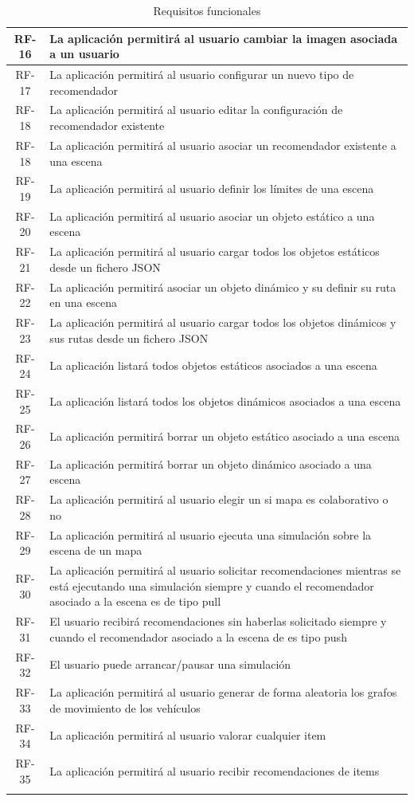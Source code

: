 \begin{longtable}[H]{|c|p{10cm}|}
	RF-16 & La aplicación permitirá al usuario cambiar la imagen asociada a un usuario\\ \hline
	RF-17 & La aplicación permitirá al usuario configurar un nuevo tipo de recomendador\\ \hline
	RF-18 & La aplicación permitirá al usuario editar la configuración de recomendador existente\\ \hline
	RF-18 & La aplicación permitirá al usuario asociar un recomendador existente a una escena\\ \hline
	RF-19 & La aplicación permitirá al usuario definir los límites de una escena\\ \hline
	RF-20 & La aplicación permitirá al usuario asociar un objeto estático a una escena\\ \hline
	RF-21 & La aplicación permitirá al usuario cargar todos los objetos estáticos desde un fichero JSON\\ \hline
	RF-22 & La aplicación permitirá asociar un objeto dinámico y su definir su ruta en una escena\\ \hline
	RF-23 & La aplicación permitirá al usuario cargar todos los objetos dinámicos y sus rutas desde un fichero JSON\\ \hline
	RF-24 & La aplicación listará todos objetos estáticos asociados a una escena \\ \hline
	RF-25 & La aplicación listará todos los objetos dinámicos asociados a una escena \\ \hline
	RF-26 & La aplicación permitirá borrar un objeto estático asociado a una escena\\ \hline
	RF-27 & La aplicación permitirá borrar un objeto dinámico asociado a una escena\\ \hline
	RF-28 & La aplicación permitirá al usuario elegir un si mapa es colaborativo o no\\ \hline
	RF-29 & La aplicación permitirá al usuario ejecuta una simulación sobre la escena de un mapa\\ \hline
	RF-30 & La aplicación permitirá al usuario solicitar recomendaciones mientras se está ejecutando una simulación siempre y cuando el recomendador asociado a la escena es de tipo pull\\ \hline
	RF-31 & El usuario recibirá recomendaciones sin haberlas solicitado siempre y cuando el recomendador asociado a la escena de es tipo push\\ \hline
	RF-32 & El usuario puede arrancar/pausar una simulación\\ \hline
	RF-33 & La aplicación permitirá al usuario generar de forma aleatoria los grafos de movimiento de los vehículos \\ \hline	
	RF-34 & La aplicación permitirá al usuario valorar cualquier item \\ \hline	
	RF-35 & La aplicación permitirá al usuario recibir recomendaciones de items \\ \hline
	\caption{Requisitos funcionales}
	\label{tabla:requisitosFuncionales2}
\end{longtable}


